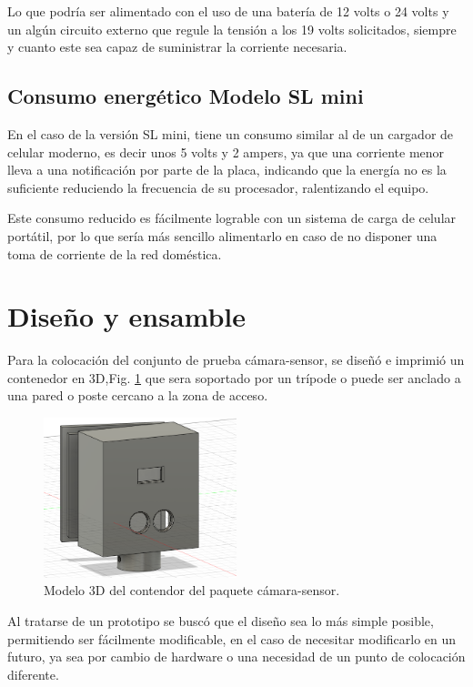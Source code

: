 Lo que podría ser alimentado con el uso de una batería de 12 volts o 24 volts y un algún circuito externo que regule la 
tensión a los 19 volts solicitados, siempre y cuanto este sea capaz de suministrar la corriente necesaria.

\subsection{Consumo energético Modelo SL mini}

En el caso de la versión SL mini, tiene un consumo similar al de un cargador de celular moderno, es decir unos 5 volts y
2 ampers, ya que una corriente menor lleva a una notificación por parte de la placa, indicando que la energía no es la 
suficiente reduciendo la frecuencia de su procesador, ralentizando el equipo.

Este consumo reducido es fácilmente lograble con un sistema de carga de celular portátil, por lo que sería más sencillo 
alimentarlo en caso de no disponer una toma de corriente de la red doméstica.

\section{Diseño y ensamble}

Para la colocación del conjunto de prueba cámara-sensor, se diseñó e imprimió un contenedor en 3D,Fig. \ref{fig:contenedor-camara}
que sera soportado por un trípode o puede ser anclado a una pared o poste cercano a la zona de acceso.
\begin{figure}
    \centering
    \includegraphics[width=0.5\textwidth]{imgs/contenedor-camara.png}
    \caption{Modelo 3D del contendor del paquete cámara-sensor.}
    \label{fig:contenedor-camara}
\end{figure}

Al tratarse de un prototipo se buscó que el diseño sea lo más simple posible, permitiendo ser fácilmente modificable, en el caso de necesitar
modificarlo en un futuro, ya sea por cambio de hardware o una necesidad de un punto de colocación diferente.


